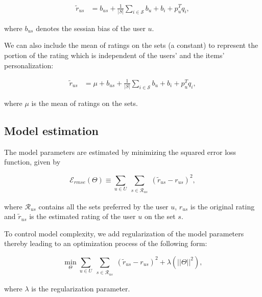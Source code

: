 \begin{equation} \label{avgSetWSessBiasEq}
  \begin{split}
    \tilde{r}_{us} &= b_{us} + \frac{1}{|S|} \sum_{i \in \mathcal{S}} b_u + b_i + p_u^Tq_i,
  \end{split}
\end{equation}

\noindent where $b_{us}$ denotes the sessian bias of the user $u$.


We can also include the mean of ratings on the sets (a constant) to represent  
the portion of the rating which is independent of the users' and the
items' personalization:

\begin{equation} \label{avgSetWGBiasEq}
  \begin{split}
    \tilde{r}_{us} &= \mu + b_{us} + \frac{1}{|S|} \sum_{i \in \mathcal{S}} b_u + b_i + p_u^Tq_i,
  \end{split}
\end{equation}

\noindent where $\mu$ is the mean of ratings on the sets.



\subsection{Model estimation}
The model parameters are estimated by minimizing the squared error
loss function, given by

%
\begin{equation} \label{eq_rmse}
  \mathcal{E}_{rmse}(\Theta) \equiv \sum_{u \in U} \sum_{\substack{s \in
  \mathcal{R}_{us}}} (\tilde{r}_{us} - r_{us})^2,
\end{equation}
%


where $\mathcal{R}_{us}$ contains all the sets preferred by the user $u$,
$r_{us}$ is the original rating and $\tilde{r}_{us}$ is the estimated rating of
the user $u$ on the set $s$. 

To control model complexity, we add regularization of the model parameters
thereby leading to an optimization process of the following form:

%
\begin{equation} \label{eq_obj}
  \min_{\Theta} \sum_{u \in U} \sum_{\substack{s \in \mathcal{R}_{us}}}
  (\tilde{r}_{us} - r_{us})^2  + \lambda (||\Theta||^2),
\end{equation}
%

where $\lambda$ is the regularization parameter.

